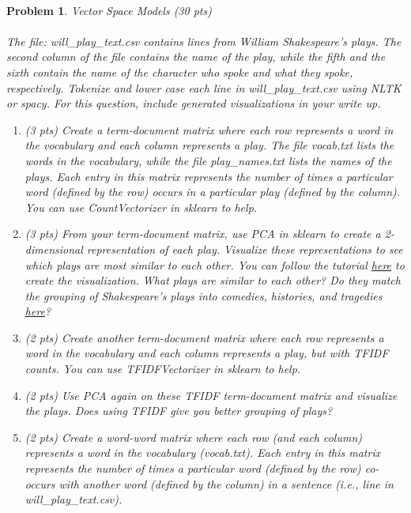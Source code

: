 \documentclass{article}
\newtheorem{problem}{Problem}
\begin{document}
\paragraph{}
\begin{problem} Vector Space Models (30 pts)
\\\\
The file: will\_play\_text.csv contains lines from William Shakespeare's plays. The second column of the file contains the name of the play, while the fifth and the sixth contain the name of the character who spoke and what they spoke, respectively. Tokenize and lower case each line in will\_play\_text.csv using NLTK or spacy. For this question, include generated visualizations in your write up. 
\begin{enumerate}
    \item (3 pts) Create a term-document matrix where each row represents a word in the vocabulary and each column represents a play. The file vocab.txt lists the words in the vocabulary, while the file play\_names.txt lists the names of the plays. Each entry in this matrix represents the number of times a particular word (defined by the row) occurs in a particular play (defined by the column). You can use CountVectorizer in sklearn to help. 
    \item (3 pts) From your term-document matrix, use PCA in sklearn to create a 2-dimensional representation of each play. Visualize these representations to see which plays are most similar to each other. You can follow the tutorial \href{https://machinelearningmastery.com/develop-word-embeddings-python-gensim/}{here} to create the visualization.  What plays are similar to each other? Do they match the grouping of Shakespeare's plays into comedies, histories, and tragedies \href{https://en.wikipedia.org/wiki/Shakespeare\%27s_plays#Canonical_plays}{here}?
    \item (2 pts) Create another term-document matrix where each row represents a word in the vocabulary and each column represents a play, but with TFIDF counts. You can use TFIDFVectorizer in sklearn to help.
    \item (2 pts) Use PCA again on these TFIDF term-document matrix and visualize the plays. Does using TFIDF give you better grouping of plays?
    \item (2 pts) Create a word-word matrix where each row (and each column) represents a word in the vocabulary (vocab.txt). Each entry in this matrix represents the number of times a particular word (defined by the row) co-occurs with another word (defined by the column) in a sentence (i.e., line in will\_play\_text.csv). 

\end{enumerate}
\end{problem}
\end{document}
